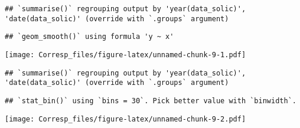\documentclass[
]{article}
\newenvironment{Shaded}{\begin{snugshade}}{\end{snugshade}}
\newcommand{\DataTypeTok}[1]{\textcolor[rgb]{0.13,0.29,0.53}{#1}}
\newcommand{\DecValTok}[1]{\textcolor[rgb]{0.00,0.00,0.81}{#1}}
\newcommand{\KeywordTok}[1]{\textcolor[rgb]{0.13,0.29,0.53}{\textbf{#1}}}
\newcommand{\NormalTok}[1]{#1}
\newcommand{\OperatorTok}[1]{\textcolor[rgb]{0.81,0.36,0.00}{\textbf{#1}}}
\newcommand{\StringTok}[1]{\textcolor[rgb]{0.31,0.60,0.02}{#1}}
\begin{document}
\begin{verbatim}
## `summarise()` regrouping output by 'year(data_solic)', 'date(data_solic)' (override with `.groups` argument)
\end{verbatim}

\begin{verbatim}
## `geom_smooth()` using formula 'y ~ x'
\end{verbatim}

\texttt{[image: Corresp\_files/figure-latex/unnamed-chunk-9-1.pdf]}

\begin{Shaded}
\end{Shaded}

\begin{verbatim}
## `summarise()` regrouping output by 'year(data_solic)', 'date(data_solic)' (override with `.groups` argument)
\end{verbatim}

\begin{verbatim}
## `stat_bin()` using `bins = 30`. Pick better value with `binwidth`.
\end{verbatim}

\texttt{[image: Corresp\_files/figure-latex/unnamed-chunk-9-2.pdf]}
\end{document}
